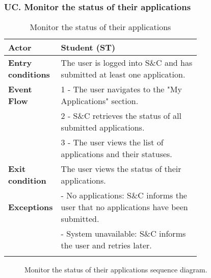 \subsubsection*{UC\cuc . Monitor the status of their applications}
\begin{center}
    \begin{longtable}{|l|p{0.75\linewidth}|}
        \hline
        \textbf{Actor}            & Student (ST) \\
        \hline
        \textbf{Entry conditions} & The user is logged into S\&C and has submitted at least one application. \\
        \hline
        \textbf{Event Flow}       & 1 - The user navigates to the "My Applications" section. \\
        & 2 - S\&C retrieves the status of all submitted applications. \\
        & 3 - The user views the list of applications and their statuses. \\
        \hline
        \textbf{Exit condition}   & The user views the status of their applications. \\       
        \hline
        \textbf{Exceptions}       & - No applications: S\&C informs the user that no applications have been submitted. \\
                                  & - System unavailable: S\&C informs the user and retries later. \\
        \hline
        \caption{Monitor the status of their applications}
        \label{tab:monitor_status_applications_usecase}
    \end{longtable}
\end{center}

\begin{figure}[H]
    \begin{center}
        
        \caption{Monitor the status of their applications sequence diagram.}
        \label{fig:monitor_status_seqd}%
    \end{center}
\end{figure}

